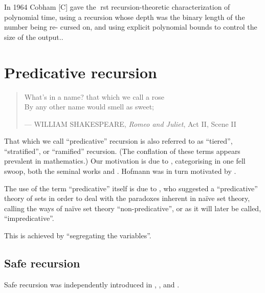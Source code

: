 In 1964 Cobham [C] gave the rst recursion-theoretic characterization of
polynomial time, using a recursion whose depth was the binary length of the
number being re- cursed on, and using explicit polynomial bounds to control the
size of the output.\cite{bellantoni-phd-1992}.

\section{Predicative recursion}

\begin{quotation}

\footnotesize\sffamily\itshape

\begin{flushright}

What's in a name? that which we call a rose \\
By any other name would smell as sweet;

\smallbreak

\upshape

--- WILLIAM SHAKESPEARE, \emph{Romeo and Juliet}, Act II, Scene II

\end{flushright}

\end{quotation}

That which we call ``predicative'' recursion is also referred to as
``tiered''\cite{leivant-1990}, ``stratified''\cite{leivant-1993}, or
``ramified''\cite{leivant-1995} recursion. (The conflation of these terms
appears prevalent in mathematics.) Our motivation is due to
\cite{hofmann-2000a}, categorising in one fell swoop, both the seminal works
\cite{bellantoni-cook-1992} and \cite{leivant-1995}. Hofmann was in turn
motivated by \cite{bellantoni-phd-1992}.

The use of the term ``predicative'' itself is due to \cite{russel-1907}, who
suggested a ``predicative'' theory of sets in order to deal with the paradoxes
inherent in na\"ive set theory, calling the ways of na\"ive set theory
``non-predicative'', or as it will later be called\cite{kleene-1952},
``impredicative''.

This is achieved by ``segregating the variables''.


\subsection{Safe recursion}

Safe recursion was independently introduced in \cite{simmons-1988},
\cite{leivant-1990}, and \cite{bellantoni-cook-1992}.

